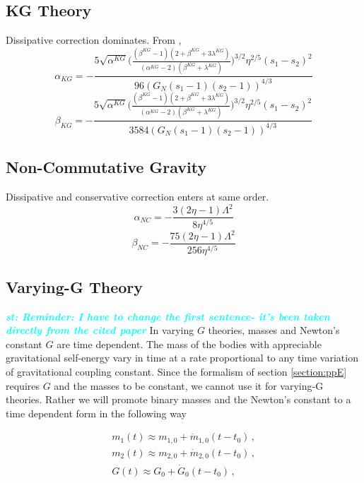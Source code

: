 \documentclass[prd,twocolumn,nofootinbib]{revtex4-1}
\newcommand{\st}[1]{\textcolor{cyan}{\it{\textbf{st: #1}}} }
\begin{document}
 \subsection{KG Theory}
 Dissipative correction dominates. From \cite{Hansen:2014ewa},
 \begin{equation}
 \alpha_{KG}=-\frac{5 \sqrt{\alpha^{KG}}\bigg(\frac{(\beta^{KG}-1)(2+\beta^{KG}+3\lambda^{KG})}{(\alpha^{KG}-2)(\beta^{KG}+\lambda^{KG})}\bigg)^{3/2}\eta ^{2/5} (\text{$s_1$}-\text{$s_2$})^2}{96 (\text{$G_N$} (\text{$s_1$}-1) (\text{$s_2$}-1))^{4/3}}
 \end{equation}
 \begin{equation}
 \beta_{KG}=-\frac{5 \sqrt{\alpha^{KG}}\bigg(\frac{(\beta^{KG}-1)(2+\beta^{KG}+3\lambda^{KG})}{(\alpha^{KG}-2)(\beta^{KG}+\lambda^{KG})}\bigg)^{3/2}\eta ^{2/5} (\text{$s_1$}-\text{$s_2$})^2}{3584(\text{$G_N$} (\text{$s_1$}-1) (\text{$s_2$}-1))^{4/3}}
 \end{equation}

 \subsection{Non-Commutative Gravity}
 Dissipative and conservative correction enters at same order. \cite{Kobakhidze:2016cqh}
 \begin{equation}
 \alpha_{NC}=-\frac{3 (2 \eta -1) \Lambda ^2}{8 \eta ^{4/5}}
 \end{equation}
 \begin{equation}
 \beta_{NC}=-\frac{75 (2 \eta -1) \Lambda ^2}{256 \eta ^{4/5}}
 \end{equation}
 \newpage
 
 \subsection{Varying-G Theory}\label{gdot}
\st{Reminder: I have to change the first sentence- it's been taken directly from the cited paper}In varying $G$ theories, masses and Newton's constant $G$ are time dependent. The mass of the bodies with appreciable gravitational self-energy vary in time at a rate proportional to any time variation of gravitational coupling constant\cite{PhysRevLett.65.953}. Since the formalism of section \ref{section:ppE} requires $G$ and the masses to be constant, we cannot use it for varying-G theories. Rather we will promote binary masses and the Newton's constant to a time dependent form in the following way
 
 \begin{eqnarray}\label{eq:3.7a2}
 m_1(t)\approx m_{1,0}+\dot{m}_{1,0}(t-t_0)\,, \\
 \label{eq:3.7a3}  m_2(t)\approx m_{2,0}+\dot{m}_{2,0}(t-t_0)\,, \\
   \label{eq:3.7a4}  G(t)\approx  G_0+\dot{G}_0(t-t_0)\, , 
 \end{eqnarray}
 
\end{document}
